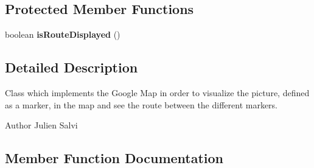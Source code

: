 \subsection*{Protected Member Functions}
\begin{DoxyCompactItemize}
\item 
boolean {\bfseries is\-Route\-Displayed} ()\label{classcom_1_1android_1_1e_perion_1_1gallery_1_1map_eperion_1_1_google_map_eperion_adfa4c7fae62620cf7f26bbe7a003d3ab}

\end{DoxyCompactItemize}


\subsection{Detailed Description}
Class which implements the Google Map in order to visualize the picture, defined as a marker, in the map and see the route between the different markers. \begin{DoxyAuthor}{Author}
Julien Salvi 
\end{DoxyAuthor}


\subsection{Member Function Documentation}
